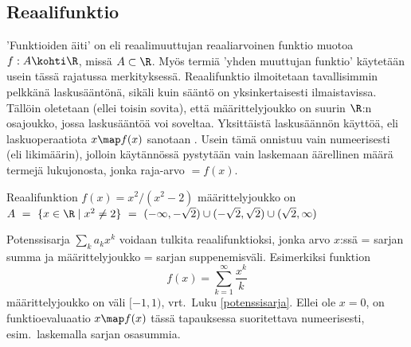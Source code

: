 \subsection*{Reaalifunktio}

'Funktioiden äiti' on  eli reaalimuuttujan reaaliarvoinen funktio muotoa
$f: A \kohti \R$, missä $A \subset \R$. Myös termiä 'yhden muuttujan funktio' käytetään usein 
tässä rajatussa merkityksessä. Reaalifunktio ilmoitetaan tavallisimmin pelkkänä laskusääntönä,
sikäli kuin sääntö on yksinkertaisesti ilmaistavissa. Tällöin oletetaan (ellei toisin sovita),
että määrittelyjoukko on suurin $\R$:n osa\-joukko, jossa laskusääntöä voi soveltaa.
Yksittäistä laskusäännön käyttöä, eli laskuoperaatiota $x \map f(x)$ sanotaan 
. Usein tämä onnistuu vain numeerisesti (eli likimäärin), 
jolloin käytännössä pystytään vain laskemaan äärellinen määrä termejä lukujonosta, jonka 
raja-arvo $=f(x)$.
\begin{Exa} Reaalifunktion $f(x)=x^2/(x^2-2)$ määrittelyjoukko on \newline
$A\ =\ \{x\in\R \mid x^2 \neq 2\}\ 
    =\ (-\infty,-\sqrt{2}) \cup (-\sqrt{2},\sqrt{2}) \cup (\sqrt{2},\infty)$ \loppu
\end{Exa}
\begin{Exa} Potenssisarja $\sum_k a_k x^k$ voidaan tulkita reaalifunktioksi, jonka arvo
$x$:ssä = sarjan summa ja määrittelyjoukko = sarjan suppenemisväli. Esimerkiksi funktion
\[
f(x)=\sum_{k=1}^\infty \frac{x^k}{k}
\]
määrittelyjoukko on väli $[-1,1)$, vrt.\ Luku \ref{potenssisarja}. Ellei ole $x=0$, on
funktioevaluaatio $x \map f(x)$ tässä tapauksessa suoritettava numeerisesti, esim.\ 
laskemalla sarjan osasummia. \loppu
\end{Exa}

